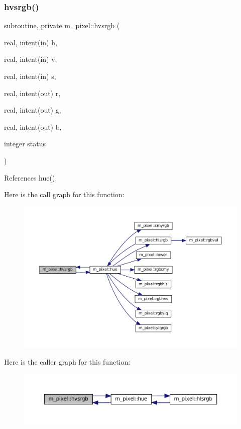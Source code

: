 \subsubsection{\texorpdfstring{hvsrgb()}{hvsrgb()}}
{\footnotesize\ttfamily subroutine, private m\+\_\+pixel\+::hvsrgb (\begin{DoxyParamCaption}\item[{real, intent(in)}]{h,  }\item[{real, intent(in)}]{v,  }\item[{real, intent(in)}]{s,  }\item[{real, intent(out)}]{r,  }\item[{real, intent(out)}]{g,  }\item[{real, intent(out)}]{b,  }\item[{integer}]{status }\end{DoxyParamCaption})\hspace{0.3cm}{\ttfamily [private]}}



References hue().

Here is the call graph for this function\+:
\nopagebreak
\begin{figure}[H]
\begin{center}
\leavevmode
\includegraphics[width=350pt]{namespacem__pixel_a6eda5641d5c42b51d9488bd7ea743744_cgraph}
\end{center}
\end{figure}
Here is the caller graph for this function\+:
\nopagebreak
\begin{figure}[H]
\begin{center}
\leavevmode
\includegraphics[width=350pt]{namespacem__pixel_a6eda5641d5c42b51d9488bd7ea743744_icgraph}
\end{center}
\end{figure}
\mbox{\label{namespacem__pixel_a4d23e0d3f4de5b3652a4eb5a61d7dc8d}} 
